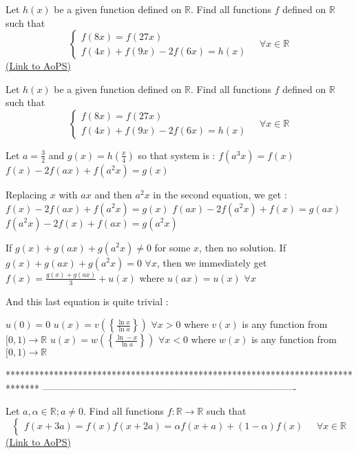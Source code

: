 \begin{problem}
	Let $h(x)$ be a given function defined  on  $\mathbb R$. Find all functions $f$ defined on $\mathbb R$ such that \[\begin{cases}f(8x)=f(27x)\\f(4x)+f(9x)-2f(6x)=h(x)\end{cases}\quad \forall x\in\mathbb R\]
	\flushright \href{https://artofproblemsolving.com/community/c6h569515}{(Link to AoPS)}
\end{problem}



\begin{solution}
	\begin{tcolorbox}Let $h(x)$ be a given function defined  on  $\mathbb R$. Find all functions $f$ defined on $\mathbb R$ such that \[\begin{cases}f(8x)=f(27x)\\f(4x)+f(9x)-2f(6x)=h(x)\end{cases}\quad \forall x\in\mathbb R\]\end{tcolorbox}
Let $a=\frac 32$ and $g(x)=h(\frac x4)$ so that system is :
$f(a^3x)=f(x)$
$f(x)-2f(ax)+f(a^2x)=g(x)$

Replacing $x$ with $ax$ and then $a^2x$ in the second equation, we get :
$f(x)-2f(ax)+f(a^2x)=g(x)$
$f(ax)-2f(a^2x)+f(x)=g(ax)$
$f(a^2x)-2f(x)+f(ax)=g(a^2x)$

If $g(x)+g(ax)+g(a^2x)\ne 0$ for some $x$, then no solution.
If $g(x)+g(ax)+g(a^2x)=0$ $\forall x$, then we immediately get $f(x)=\frac{g(x)+g(ax)}3+u(x)$ where $u(ax)=u(x)$ $\forall x$

And this last equation is quite trivial :

$u(0)=0$
$u(x)=v(\left\{\frac{\ln x}{\ln a}\right\})$ $\forall x>0$ where $v(x)$ is any function from $[0,1)\to\mathbb R$
$u(x)=w(\left\{\frac{\ln -x}{\ln a}\right\})$ $\forall x<0$ where $w(x)$ is any function from $[0,1)\to\mathbb R$
\end{solution}
*******************************************************************************
-------------------------------------------------------------------------------

\begin{problem}
	Let $a,\alpha \in\mathbb R;a\neq 0$. Find all functions $f:\mathbb R\to \mathbb R$ such that \[\begin{cases}f(x+3a)=f(x)f(x+2a)=\alpha f(x+a)+(1-\alpha)f(x)\end{cases}\quad \forall x\in\mathbb R\]
	\flushright \href{https://artofproblemsolving.com/community/c6h569516}{(Link to AoPS)}
\end{problem}



